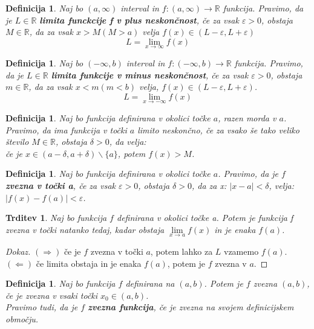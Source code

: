 \documentclass[11pt]{article}
\newtheorem{Trditev}[Izrek]{{\sc Trditev}}
\newtheorem{Definicija}[Izrek]{{\sc Definicija}}
\newenvironment{dokaz}[1][{\sc Dokaz}]{\begin{proof}[#1]\renewcommand*{\qedsymbol}{\(\blacksquare\)}}{\end{proof}}
\begin{document}
\begin{Definicija}
	Naj bo $(a, \infty)$ interval in $f: (a, \infty) \to \mathbb{R}$ funkcija. Pravimo, da je $L\in \mathbb{R}$ \textbf{limita funckcije f v plus neskončnost}, če za vsak $\varepsilon > 0$, obstaja $M\in \mathbb{R}$, da za vsak $ x > M (M > a)$ velja $f(x) \in (L - \varepsilon, L + \varepsilon)$
	$$ L = \lim\limits_{x\to \infty}{f(x)}$$
\end{Definicija}
\begin{Definicija}
	Naj bo $(-\infty, b)$ interval in $f: (-\infty, b) \to \mathbb{R}$ funkcija. Pravimo, da je $L\in \mathbb{R}$ \textbf{limita funkcije v minus neskončnost}, če za vsak $\varepsilon > 0$, obstaja $m \in \mathbb{R}$, da za vsak $x < m (m < b)$ velja, $f(x) \in (L -\varepsilon, L +\varepsilon )$.
	$$ L = \lim\limits_{x \to -\infty}{f(x)}$$
\end{Definicija}
\begin{Definicija}
	Naj bo funkcija definirana v okolici točke $a$, razen morda v $a$. Pravimo, da ima funkcija v točki $a$ limito neskončno, če za vsako še tako veliko število $M\in \mathbb{R}$, obstaja $\delta > 0$, da velja:
	\\
	če je $x \in (a - \delta, a+ \delta)\backslash \{a\}$, potem $f(x) > M$.
\end{Definicija}
\begin{Definicija}
	Naj bo funkcija definirana v okolici točke $a$. Pravimo, da je $f$ \textbf{zvezna v točki a}, če za vsak $\varepsilon > 0$, obstaja $\delta > 0$, da za x: $ |x - a| < \delta$, velja: $|f(x) - f(a) | < \varepsilon$.
\end{Definicija}
\begin{Trditev}
	Naj bo funkcija $f$ definirana v okolici točke a. Potem je funkcija f zvezna v točki natanko tedaj, kadar obstaja $\lim\limits_{x \to a}{f(x)}$  in je enaka $f(a)$.
\end{Trditev}
\begin{dokaz}
	$(\Rightarrow)$ če je $f$ zvezna v točki $a$, potem lahko za $L$ vzamemo $f(a)$.
	\\
	$(\Leftarrow)$ če limita obstaja in je enaka $f(a)$, potem je $f$ zvezna v $a$.
\end{dokaz}
\begin{Definicija}
	Naj bo funkcija $f$ definirana na $(a,b)$. Potem je $f$ zvezna $(a,b)$, če je zvezna v vsaki točki $x_0 \in (a,b)$.
	\\
	Pravimo tudi, da je $f$ \textbf{zvezna funkcija}, če je zvezna na svojem definicijskem območju.
\end{Definicija}
\end{document}
